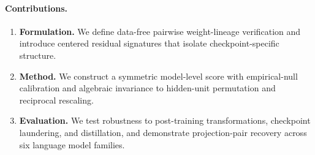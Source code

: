 \paragraph{Contributions.}
\begin{enumerate}[leftmargin=*,itemsep=2pt,topsep=2pt]
\item \textbf{Formulation.} We define data-free pairwise weight-lineage verification and introduce centered residual signatures that isolate checkpoint-specific structure.

\item \textbf{Method.} We construct a symmetric model-level score with empirical-null calibration and algebraic invariance to hidden-unit permutation and reciprocal rescaling.

\item \textbf{Evaluation.} We test robustness to post-training transformations, checkpoint laundering, and distillation, and demonstrate projection-pair recovery across six language model families.
\end{enumerate}
